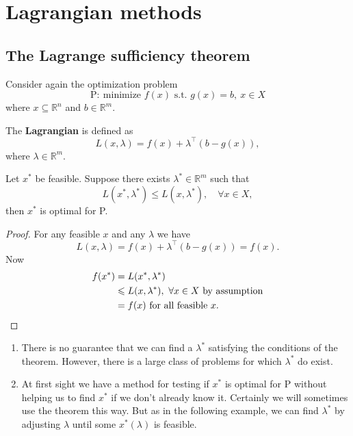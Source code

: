 \section{Lagrangian methods}
\subsection{The Lagrange sufficiency theorem}
Consider again the optimization problem
\[
    \text{P}: \ \text{minimize }f(x) \text{ s.t. } g(x)=b,\ x\in X
\]
where $ x \subseteq \mathbb{R}^{n} $ and $b\in \mathbb{R}^{m}$. 

\begin{definition}
    The \textbf{Lagrangian} is defined as 
\[
    L(x,\lambda) = f(x) + \lambda^\top(b-g(x)),
\]
where $ \lambda\in \mathbb{R}^{m} $. 
\end{definition}

\begin{theorem}
    Let $x^*$ be feasible. Suppose there exists $ \lambda^*\in \mathbb{R}^{m} $ such that 
    \[
        L(x^*,\lambda^*)\le L(x,\lambda^*),\quad \forall x\in X, 
    \]
    then $x^*$ is optimal for P.
\end{theorem}
\begin{proof}
    For any feasible $x$ and any $\lambda$ we have 
    \[
        L(x,\lambda) = f(x) + \lambda^\top (b-g(x)) = f(x). 
    \]
    Now 
    \begin{align*}
        f(x^*) & = L(x^*,\lambda^*)\\ 
        &\le L(x,\lambda^*),\ \forall x\in X \text{ by assumption}\\ 
        &= f(x) \text{ for all feasible } x. \qedhere
    \end{align*}
\end{proof}

\begin{remark}
\begin{enumerate}
    \item There is no guarantee that we can find a $\lambda^*$ satisfying the conditions of the theorem. However, there is a large class of problems for which $\lambda^*$ do exist.
    \item At first sight we have a method for testing if $x^*$ is optimal for $\mathrm{P}$ without helping us to find $x^*$ if we don't already know it. Certainly we will sometimes use the theorem this way. But as in the following example, we can find $\lambda^*$ by adjusting $\lambda$ until some $x^*(\lambda)$ is feasible.
\end{enumerate}
\end{remark}

